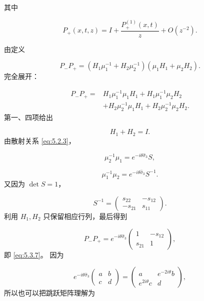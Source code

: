 \documentclass[
    lang=cn,
    scheme=chinese,
    mode=simple,
    device=normal,
    color=blue,
    math=cm,
    thmcnt=section,
    12pt,
    nowatermark
]{elegantbook}
\begin{document}
其中

\begin{equation}
    P_+(x,t,z)
    =
    I+\dfrac{P_+^{(1)}(x,t)}{z}
    +O(z^{-2}).
    \tag{5.3.9}
    \label{eq:5.3.9}
\end{equation}

\begin{callout}
    由定义

    \[
        P_-P_+
        =
        (H_1\mu_1^{-1}+H_2\mu_2^{-1})
        (\mu_1H_1+\mu_2H_2).
    \]
    完全展开：

    \[
        \begin{aligned}
            P_-P_+
            ={} &
            H_1\mu_1^{-1}\mu_1H_1
            +
            H_1\mu_1^{-1}\mu_2H_2 \\
                & +
            H_2\mu_2^{-1}\mu_1H_1
            +
            H_2\mu_2^{-1}\mu_2H_2.
        \end{aligned}
    \]
    第一、四项给出

    \[
        H_1+H_2=I.
    \]
    由散射关系 \eqref{eq:5.2.3}，

    \[
        \mu_2^{-1}\mu_1
        =
        e^{-i\theta\widehat{\sigma}_3}S,
    \]

    \[
        \mu_1^{-1}\mu_2
        =
        e^{-i\theta\widehat{\sigma}_3}S^{-1}.
    \]
    又因为 $\det S=1$，

    \[
        S^{-1}
        =
        \begin{pmatrix}
            s_{22}  & -s_{12} \\
            -s_{21} & s_{11}
        \end{pmatrix}.
    \]
    利用 $H_1,H_2$ 只保留相应行列，最后得到

    \[
        P_-P_+
        =
        e^{-i\theta\widehat{\sigma}_3}
        \begin{pmatrix}
            1      & -s_{12} \\
            s_{21} & 1
        \end{pmatrix},
    \]
    即 \eqref{eq:5.3.7}。
    因为

    \[
        e^{-i\theta\widehat{\sigma}_3}
        \begin{pmatrix}
            a & b \\c&d
        \end{pmatrix}
        =
        \begin{pmatrix}
            a             & e^{-2i\theta}b \\
            e^{2i\theta}c & d
        \end{pmatrix},
    \]
    所以也可以把跳跃矩阵理解为


\end{callout}
\end{document}
